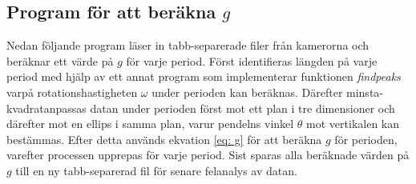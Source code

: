 \subsection{Program för att beräkna $g$}

Nedan följande program läser in tabb-separerade filer från kamerorna och beräknar ett värde på $g$ för varje period. Först identifieras längden på varje period med hjälp av ett annat program som implementerar funktionen \textit{findpeaks} varpå rotationshastigheten $\omega$ under perioden kan beräknas. Därefter minsta-kvadratanpassas datan under perioden först mot ett plan i tre dimensioner och därefter mot en ellips i samma plan, varur pendelns vinkel $\theta$ mot vertikalen kan bestämmas. Efter detta används ekvation \ref{eq: g} för att beräkna $g$ för perioden, varefter processen upprepas för varje period. Sist sparas alla beräknade värden på $g$ till en ny tabb-separerad fil för senare felanalys av datan. 


